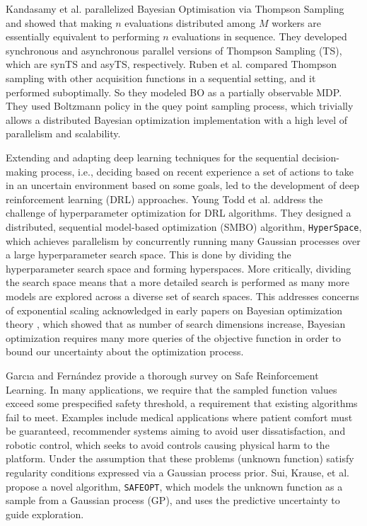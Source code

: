 Kandasamy et al.\cite{pmlr-v84-kandasamy18a} parallelized Bayesian Optimisation via Thompson Sampling and showed that making $n$ evaluations distributed among $M$ workers are essentially equivalent to performing $n$ evaluations in sequence. 
They developed synchronous and asynchronous parallel versions of Thompson Sampling (TS), which are synTS and asyTS, respectively.
Ruben et al.\cite{Ruben.distr.bo} compared Thompson sampling with other acquisition functions in a sequential setting, and it performed suboptimally. So they modeled BO as a partially observable MDP. They used Boltzmann policy in the quey point sampling process, which trivially allows a distributed Bayesian optimization implementation with a high level of parallelism and scalability.

Extending and adapting deep learning techniques for the sequential decision-making process, i.e., deciding based on recent experience a set of actions to take in an uncertain environment based on some goals, led to the development of deep reinforcement learning (DRL) approaches. 
Young Todd et al.\cite{YoungHRK18} address the challenge of hyperparameter optimization for DRL algorithms. They designed a distributed, sequential model-based optimization (SMBO) algorithm, \texttt{HyperSpace}, which achieves parallelism by concurrently running many Gaussian processes over a large hyperparameter search space. 
This is done by dividing the hyperparameter search space and forming hyperspaces. 
More critically, dividing the search space means that a more detailed search is performed as many more models are explored across a diverse set of search spaces. 
This addresses concerns of exponential scaling acknowledged in early papers on Bayesian optimization theory \cite{pmlr-v9-grunewalder10a} \cite{Srinivas.2012}, which showed that as number of search dimensions increase, Bayesian optimization requires many more queries of the objective function in order to bound our uncertainty about the optimization process.

Garcıa and Fernández \cite{garcia15a} provide a thorough survey on Safe Reinforcement Learning. 
In many applications, we require that the sampled function values exceed some prespecified safety threshold, a requirement that existing algorithms fail to meet. 
Examples include medical applications where patient comfort must be guaranteed, recommender systems aiming to avoid user dissatisfaction, and robotic control, which seeks to avoid controls causing physical harm to the platform. 
Under the assumption that these problems (unknown function) satisfy regularity conditions expressed via a Gaussian process prior. 
Sui, Krause, et al.\cite{SuiGBK15} propose a novel algorithm, \texttt{SAFEOPT}, which models the unknown function as a sample from a Gaussian process (GP), and uses the predictive uncertainty to guide exploration.

